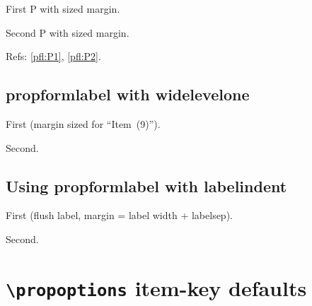 \documentclass{article}
\begin{document}

\begin{prop}[style=proposition, counter=P, items=5,
             leftmargin=\widthof{\proppredictedlabel}+0.5em]
  \item First P with sized margin.   \label{pfl:P1}
  \item Second P with sized margin.  \label{pfl:P2}
\end{prop}

Refs: \ref{pfl:P1}, \ref{pfl:P2}.

\subsection{propformlabel with widelevelone}


\begin{prop}[style=widelevelone, items=9,
             leftmargin=\widthof{\propformlabel}+0.5em]
  \item First (margin sized for ``Item~(9)''). \label{pfl:w1}
  \item Second. \label{pfl:w2}
\end{prop}

\subsection{Using propformlabel with labelindent}


\begin{prop}[style=widelevelone, items=5,
             labelindent=0em,
             leftmargin=\widthof{\propformlabel}+\labelsep]
  \item First (flush label, margin = label width + labelsep). \label{pfl:li1}
  \item Second. \label{pfl:li2}
\end{prop}

\section{\texttt{\textbackslash propoptions} item-key defaults}
\end{document}
